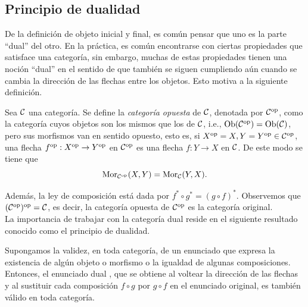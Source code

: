 \subsection{Principio de dualidad}
De la definición de objeto inicial y final, es común pensar que uno es la parte ``dual'' del otro. En la práctica, es común encontrarse con ciertas propiedades que satisface una categoría, sin embargo, muchas de estas propiedades tienen una noción ``dual'' en el sentido de que también se siguen cumpliendo aún cuando se cambia la dirección de las flechas entre los objetos. Esto motiva a la siguiente definición.
\begin{definition} Sea ${\mathcal C}$ una categoría. Se define la \emph{categoría opuesta} de ${\mathcal C}$, denotada por ${\mathcal C}^{{\mathrm{op}}}$, como la categoría cuyos objetos son los mismos que los de ${\mathcal C}$, i.e., $\operatorname{Ob}({\mathcal C}^{{\mathrm{op}}})=\operatorname{Ob}({\mathcal C})$, pero sus morfismos van en sentido opuesto, esto es, si $X^{{\mathrm{op}}}=X,Y=Y^{{\mathrm{op}}}\in{\mathcal C}^{{\mathrm{op}}}$, una flecha $f^{{\mathrm{op}}}:X^{{\mathrm{op}}}\rightarrow Y^{{\mathrm{op}}}$ en ${\mathcal C}^{{\mathrm{op}}}$ es una flecha $f:Y\rightarrow X$  en ${\mathcal C}$. De este modo se tiene que   
    \[{\mathrm{Mor}}_{{\mathcal C}^{{\mathrm{op}}}}(X,Y)={\mathrm{Mor}}_{\mathcal C}(Y,X).\]
\end{definition}
Además, la ley de composición está dada por $f^*\circ g^*=(g\circ f)^*$. Observemos  que  $({\mathcal C}^{{\mathrm{op}}})^{{\mathrm{op}}}={\mathcal C}$, es decir,  la categoría opuesta de ${\mathcal C}^{{\mathrm{op}}}$ es la categor\'ia original.\\
La importancia de trabajar con la categoría dual reside en el siguiente resultado conocido como el principio de dualidad. 
\begin{theo}
    Supongamos la validez, en toda categoría, de un enunciado que expresa la existencia de algún objeto o morfismo o la igualdad de algunas composiciones. Entonces, el \textquotedbl enunciado dual \textquotedbl, que se obtiene al voltear la dirección de las flechas y al sustituir cada composición $f\circ g$ por $g\circ f$ en el enunciado original, es también válido en  toda categoría.
\end{theo}
